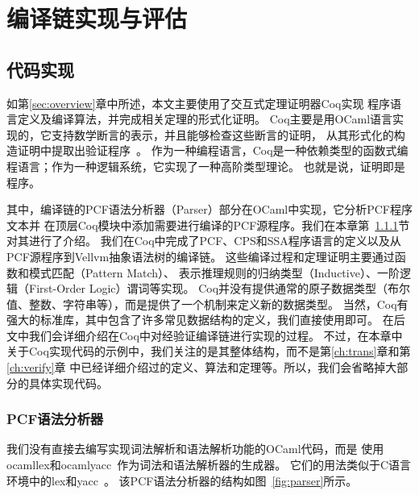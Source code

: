 
\chapter{编译链实现与评估} \label{ch:implement}

\setcounter{lstlisting}{1}
\section{代码实现}

如第\ref{sec:overview}章中所述，本文主要使用了交互式定理证明器Coq实现
程序语言定义及编译算法，并完成相关定理的形式化证明。
Coq主要是用OCaml语言实现的，它支持数学断言的表示，并且能够检查这些断言的证明，
从其形式化的构造证明中提取出验证程序~\cite{paulin2011introduction,chlipala2022certified}。
作为一种编程语言，Coq是一种依赖类型的函数式编程语言；作为一种逻辑系统，它实现了一种高阶类型理论。
也就是说，证明即是程序。

其中，编译链的PCF语法分析器（Parser）部分在OCaml中实现，它分析PCF程序文本并
在顶层Coq模块中添加需要进行编译的PCF源程序。我们在本章第~\ref{sec:pcfparser}节对其进行了介绍。
我们在Coq中完成了PCF、CPS和SSA程序语言的定义以及从PCF源程序到Vellvm抽象语法树的编译链。
这些编译过程和定理证明主要通过函数和模式匹配（Pattern Match）、
表示推理规则的归纳类型（Inductive）、一阶逻辑（First-Order Logic）谓词等实现。
Coq并没有提供通常的原子数据类型（布尔值、整数、字符串等），而是提供了一个机制来定义新的数据类型。
当然，Coq有强大的标准库，其中包含了许多常见数据结构的定义，我们直接使用即可。
在后文中我们会详细介绍在Coq中对经验证编译链进行实现的过程。
不过，在本章中关于Coq实现代码的示例中，我们关注的是其整体结构，而不是第\ref{ch:trans}章和第\ref{ch:verify}章
中已经详细介绍过的定义、算法和定理等。所以，我们会省略掉大部分的具体实现代码。

\subsection{PCF语法分析器} \label{sec:pcfparser}
我们没有直接去编写实现词法解析和语法解析功能的OCaml代码，而是
使用ocamllex和ocamlyacc~\cite{smith2007ocamllex}作为词法和语法解析器的生成器。
它们的用法类似于C语言环境中的lex和yacc~\cite{levine1992lex}。
该PCF语法分析器的结构如图~\ref{fig:parser}所示。


